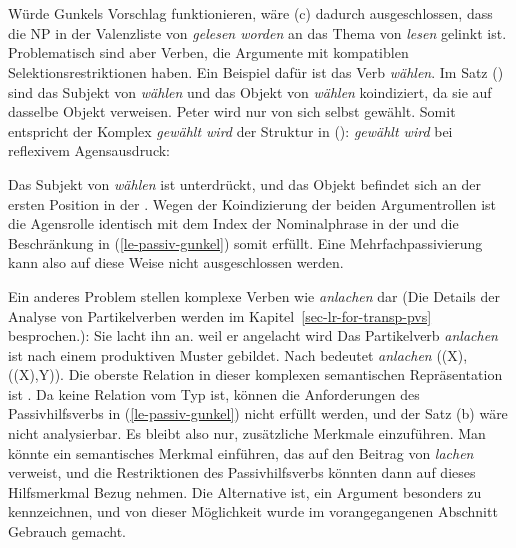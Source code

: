 {{{{{                                                   }\\
                                          } }\\
}
\zs
Würde Gunkels Vorschlag funktionieren, wäre (c) dadurch ausgeschlossen,
dass die NP in der Valenzliste von \emph{gelesen worden} an das Thema von \emph{lesen}
gelinkt ist. Problematisch sind aber Verben, die Argumente mit kompatiblen
Selektionsrestriktionen haben. Ein Beispiel dafür ist das Verb \emph{wählen}.
Im Satz () sind das Subjekt von \emph{wählen} und das Objekt von \emph{wählen}
koindiziert, da sie auf dasselbe Objekt verweisen.
\ea
Peter wird nur von sich selbst gewählt.
\z
Somit entspricht der Komplex \emph{gewählt wird} der Struktur in ():
\eas
\emph{gewählt wird} bei reflexivem Agensausdruck:\\
\zs

\noindent
Das Subjekt von \emph{wählen} ist unterdrückt, und das Objekt befindet sich an der ersten
Position in der \compsl. Wegen der Koindizierung der beiden Argumentrollen ist die
Agensrolle identisch mit dem Index der Nominalphrase in der \compsl und die Beschränkung
in (\ref{le-passiv-gunkel}) somit erfüllt. Eine Mehrfachpassivierung kann also auf diese Weise
nicht ausgeschlossen werden.

Ein anderes Problem stellen komplexe Verben wie \emph{anlachen} dar (Die Details
der Analyse von Partikelverben werden im Kapitel~\ref{sec-lr-for-transp-pvs} besprochen.):
\eal
\ex Sie lacht ihn an.
\ex weil er angelacht wird
\zl
Das Partikelverb \emph{anlachen} ist nach einem produktiven Muster gebildet. Nach
 bedeutet \emph{anlachen} ((X), ((X),Y)).
Die oberste Relation in dieser komplexen semantischen Repräsentation ist .
Da  keine Relation vom Typ  ist, können die Anforderungen
des Passivhilfsverbs in (\ref{le-passiv-gunkel}) nicht erfüllt werden, und der
Satz (b) wäre nicht analysierbar. Es bleibt also nur, zusätzliche Merkmale einzuführen.
Man könnte ein semantisches Merkmal einführen, das
auf den Beitrag von \emph{lachen} verweist, und die Restriktionen des Passivhilfsverbs
könnten dann auf dieses Hilfsmerkmal Bezug nehmen. Die Alternative ist, ein Argument
besonders zu kennzeichnen, und von dieser Möglichkeit wurde im vorangegangenen Abschnitt
Gebrauch gemacht.

}
